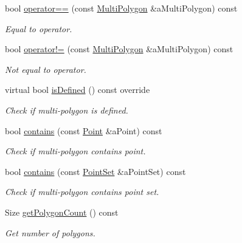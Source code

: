 \begin{DoxyCompactItemize}
bool \hyperlink{classostk_1_1math_1_1geom_1_1d2_1_1objects_1_1_multi_polygon_a8f3d731143998dacaaea1f0dffa9fa2c}{operator==} (const \hyperlink{classostk_1_1math_1_1geom_1_1d2_1_1objects_1_1_multi_polygon}{Multi\+Polygon} \&a\+Multi\+Polygon) const
\begin{DoxyCompactList}\small\item\em Equal to operator. \end{DoxyCompactList}\item 
bool \hyperlink{classostk_1_1math_1_1geom_1_1d2_1_1objects_1_1_multi_polygon_aa2c66641f9b699bdc4795d93078b8d8a}{operator!=} (const \hyperlink{classostk_1_1math_1_1geom_1_1d2_1_1objects_1_1_multi_polygon}{Multi\+Polygon} \&a\+Multi\+Polygon) const
\begin{DoxyCompactList}\small\item\em Not equal to operator. \end{DoxyCompactList}\item 
virtual bool \hyperlink{classostk_1_1math_1_1geom_1_1d2_1_1objects_1_1_multi_polygon_a27e84e80acbae4c2a7436a4d5c07b576}{is\+Defined} () const override
\begin{DoxyCompactList}\small\item\em Check if multi-\/polygon is defined. \end{DoxyCompactList}\item 
bool \hyperlink{classostk_1_1math_1_1geom_1_1d2_1_1objects_1_1_multi_polygon_a7b0795460707a8ee2cac31dfe7891466}{contains} (const \hyperlink{classostk_1_1math_1_1geom_1_1d2_1_1objects_1_1_point}{Point} \&a\+Point) const
\begin{DoxyCompactList}\small\item\em Check if multi-\/polygon contains point. \end{DoxyCompactList}\item 
bool \hyperlink{classostk_1_1math_1_1geom_1_1d2_1_1objects_1_1_multi_polygon_ad58e3e306864939951e8724bf9213d52}{contains} (const \hyperlink{classostk_1_1math_1_1geom_1_1d2_1_1objects_1_1_point_set}{Point\+Set} \&a\+Point\+Set) const
\begin{DoxyCompactList}\small\item\em Check if multi-\/polygon contains point set. \end{DoxyCompactList}\item 
Size \hyperlink{classostk_1_1math_1_1geom_1_1d2_1_1objects_1_1_multi_polygon_a52386a4ee9cf5fa92cb42e9d4ba3fd93}{get\+Polygon\+Count} () const
\begin{DoxyCompactList}\small\item\em Get number of polygons. \end{DoxyCompactList}\item 

\end{DoxyCompactItemize}
